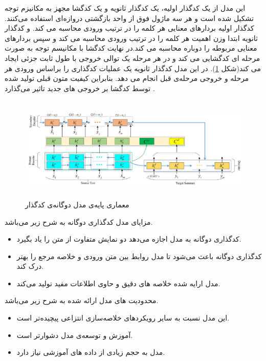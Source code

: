    این مدل از یک کدگذار اولیه، یک کدگذار ثانویه و یک کدگشا مجهز به مکانیزم توجه تشکیل شده است و هر سه ماژول فوق از واحد بازگشتی دروازه‌ای
   استفاده می‌کنند. 
   کدگذار اولیه بردارهای معنایی هر کلمه را در ترتیب ورودی محاسبه می کند. و کدگذار ثانویه ابتدا وزن اهمیت هر کلمه را در ترتیب ورودی محاسبه می کند و سپس بردارهای معنایی مربوطه را دوباره محاسبه می کند.در نهایت کدگشا با مکانیسم توجه به صورت مرحله ای کدگشایی می کند و در هر مرحله یک توالی خروجی با طول ثابت جزئی ایجاد می کند(شکل \ref{fig:dual_encoder}). در این مدل کدگذار ثانویه یک عملیات کدگذاری را براساس ورودی هر مرحله و خروجی مرحله‌ی قبل انجام می دهد. بنابراین کیفیت متون قبلی تولید شده توسط کدگشا بر خروجی های جدید تاثیر می‌گذارد
   \cite{yao2018dual}.
   
   
   
   \begin{figure}[!h]
   	\begin{center}
   		\includegraphics[height=5cm]{dualـencoder.png}
   	\end{center}
   	\caption{معماری پایه‌‌ی مدل دوگانه‌ی کدگذار   	\cite{yao2018dual}}
   	\label{fig:dual_encoder}
   	\medskip
   	\small
   \end{figure}
   
   مزایای مدل کدگذاری دوگانه به شرح زیر می‌باشد.
   \begin{itemize}
   	\item {
   		کدگذاری دوگانه به مدل اجازه می‌دهد دو نمایش متفاوت از متن را یاد بگیرد.   	}
   \item{
   کدگذاری دوگانه باعث می‌شود تا مدل روابط بین متن ورودی و خلاصه مرجع را بهتر درک کند.}
\item{مدل ارایه شده خلاصه های دقیق و حاوی اطلاعات مفید تولید می‌کند.}
   \end{itemize}
محدودیت های مدل ارائه شده به شرح زیر می‌باشد.
\begin{itemize}
	\item {     
		این مدل نسبت به سایر رویکردهای خلاصه‌سازی  انتزاعی پیچیده‌تر است.	}
	\item { 		 آموزش و توسعه‌ی مدل  دشوارتر است.	}
	\item {		مدل به حجم زیادی از داده های آموزشی نیاز دارد.		}
\end{itemize}

